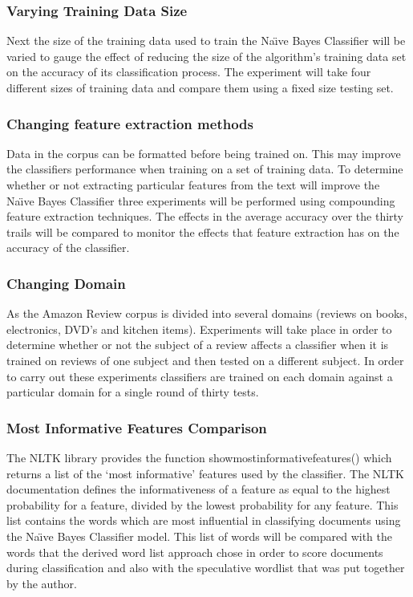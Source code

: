 \documentclass{llncs}
\begin{document}
\subsubsection{Varying Training Data Size}
Next the size of the training data used to train the Na\"\i ve Bayes Classifier will be varied to gauge the effect of reducing the size of the algorithm's training data set on the accuracy of its classification process. The experiment will take four different sizes of training data and compare them using a fixed size testing set.

\subsubsection{Changing feature extraction methods}
Data in the corpus can be formatted before being trained on. This may improve the classifiers performance when training on a set of training data. To determine whether or not extracting particular features from the text will improve the Na\"\i ve Bayes Classifier three experiments will be performed using compounding feature extraction techniques. The effects in the average accuracy over the thirty trails will be compared to monitor the effects that feature extraction has on the accuracy of the classifier.

\subsubsection{Changing Domain}
As the Amazon Review corpus is divided into several domains (reviews on books, electronics, DVD's and kitchen items). Experiments will take place in order to determine whether or not the subject of a review affects a classifier when it is trained on reviews of one subject and then tested on a different subject. In order to carry out these experiments classifiers are trained on each domain against a particular domain for a single round of thirty tests. 

\subsubsection{Most Informative Features Comparison}
The NLTK library provides the function show\textunderscore most\textunderscore informative\textunderscore features() which returns a list of the `most informative' features used by the classifier.
The NLTK documentation defines the informativeness of a feature as equal to the highest probability for a feature, divided by the lowest probability for any feature. This list contains the words which are most influential in classifying documents using the Na\"\i ve Bayes Classifier model. This list of words will be compared with the words that the derived word list approach chose in order to score documents during classification and also with the speculative wordlist that was put together by the author.
\end{document}
